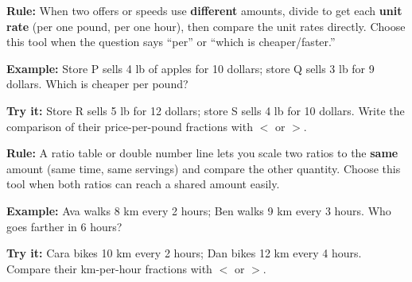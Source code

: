 \documentclass[12pt]{article}
\begin{document}


\begin{formulabox}
\textbf{Rule:} When two offers or speeds use \textbf{different} amounts, divide
to get each \textbf{unit rate} (per one pound, per one hour), then compare the
unit rates directly. Choose this tool when the question says ``per'' or ``which
is cheaper/faster.''
\end{formulabox}

\begin{examplebox}
\textbf{Example:} \quad Store P sells 4 lb of apples for 10 dollars; store Q
sells 3 lb for 9 dollars. Which is cheaper per pound?
\end{examplebox}

\begin{tryitbox}
\textbf{Try it:} \quad Store R sells 5 lb for 12 dollars; store S sells 4 lb for
10 dollars. Write the comparison of their price-per-pound fractions with $<$ or
$>$.\\[2pt]
\end{tryitbox}


\begin{formulabox}
\textbf{Rule:} A ratio table or double number line lets you scale two ratios to
the \textbf{same} amount (same time, same servings) and compare the other
quantity. Choose this tool when both ratios can reach a shared amount easily.
\end{formulabox}

\begin{examplebox}
\textbf{Example:} \quad Ava walks 8 km every 2 hours; Ben walks 9 km every 3
hours. Who goes farther in 6 hours?
\end{examplebox}

\begin{tryitbox}
\textbf{Try it:} \quad Cara bikes 10 km every 2 hours; Dan bikes 12 km every 4
hours. Compare their km-per-hour fractions with $<$ or $>$.\\[2pt]
\end{tryitbox}
\end{document}
